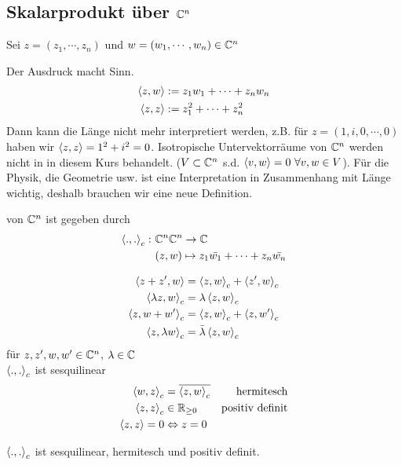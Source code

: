 \subsection{Skalarprodukt über $\mathbb{C}^n$}
Sei $z=(z_1,\cdots,z_n)$ und $w=(w_1,\cdots,w_n)\in\mathbb{C}^n$
\begin{Bem}
  Der Ausdruck macht Sinn.
  \begin{align*}
    \left\langle z,w \right\rangle&:=z_1w_1+\cdots+z_nw_n\\
    \left\langle z,z \right\rangle&:=z_1^2+\cdots+z_n^2\\
  \end{align*}
  Dann kann die Länge nicht mehr interpretiert werden, z.B. für $z=(1,i,0,\cdots,0)$ haben wir $\left\langle z,z \right\rangle=1^2+i^2=0$. Isotropische Untervektorräume von $\mathbb{C}^n$ werden nicht in in diesem Kurs behandelt. ($V\subset\mathbb{C}^n$ s.d. $\left\langle v,w \right\rangle=0 \ \forall v,w\in V$). Für die Physik, die Geometrie usw. ist eine Interpretation in Zusammenhang mit Länge wichtig, deshalb brauchen wir eine neue Definition.
\end{Bem}
\begin{Def}
  von $\mathbb{C}^n$ ist gegeben durch
  \begin{align*}
    \left\langle .,. \right\rangle_c:&\ \mathbb{C}^n\mathbb{C}^n\to\mathbb{C}\\
    &\ (z,w)\mapsto z_1\bar{w_1}+\cdots+z_n\bar{w_n}
  \end{align*}
\end{Def}
\begin{Eig}
  \begin{align*}
    \left\langle z+z',w \right\rangle&= \left\langle z,w \right\rangle_c+\left\langle z',w \right\rangle_c\\
    \left\langle \lambda z,w \right\rangle_c&= \lambda\left\langle z,w \right\rangle_c\\
    \left\langle z,w+w' \right\rangle_c&= \left\langle z,w \right\rangle_c+\left\langle z,w' \right\rangle_c\\
    \left\langle z,\lambda w \right\rangle_c&= \bar{\lambda}\left\langle z,w \right\rangle_c
  \end{align*}
  für $z,z',w,w'\in\mathbb{C}^n$, $\lambda\in\mathbb{C}$\\
  $\left\langle .,. \right\rangle_c$ ist sesquilinear
  \begin{align*}
    \left\langle w,z \right\rangle_c&= \overline{\left\langle z,w \right\rangle_c}& \text{hermitesch}\\
    \left\langle z,z \right\rangle_c&\in\mathbb{R}_{\geq 0}& \text{positiv definit}\\
    \left\langle z,z \right\rangle=0 &\Leftrightarrow z=0
  \end{align*}
\end{Eig}
\begin{Faz}
  $\left\langle .,. \right\rangle_c$ ist sesquilinear, hermitesch und positiv definit.
\end{Faz}
